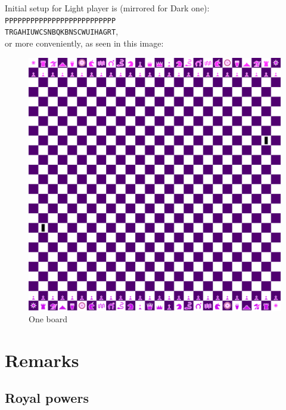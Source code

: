 \documentclass[a5paper,12pt,draft]{book} %
\begin{document}
Initial setup for Light player is (mirrored for Dark one):
\texttt{PPPPPPPPPPPPPPPPPPPPPPPPPP \\
        TRGAHIUWCSNBQKBNSCWUIHAGRT}, \\
or more conveniently, as seen in this image:

\noindent
\begin{figure}[h]
\includegraphics[width=1.0\textwidth, keepaspectratio=true]{../gfx/boards/22_one.png}
\caption{One board}
\label{fig:one}
\end{figure}

\clearpage

\chapter*{Remarks}

\section*{Royal powers}
\end{document}
